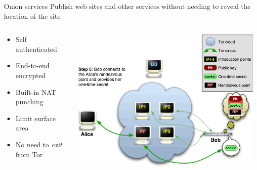 \documentclass[aspectratio=169,10pt]{beamer}
\begin{document}
  
  
  \begin{frame}[fragile]{Onion services}
    Publish web sites and other services without needing to reveal the location of the site
    \begin{columns}
      \begin{column}{0.5\textwidth}
        \begin{itemize}
          \item Self authenticated
          \item End-to-end encrypted
          \item Built-in NAT punching
          \item Limit surface area
          \item No need to \emph{exit} from Tor
        \end{itemize}
      \end{column}
      \begin{column}{0.5\textwidth}
        \begin{center}
          \href{https://www.torproject.org/docs/onion-services.html.en}{\includegraphics[width=\textwidth]{img/onion5.png}}
        \end{center}
      \end{column}
    \end{columns}
  \end{frame}
  
\end{document}
